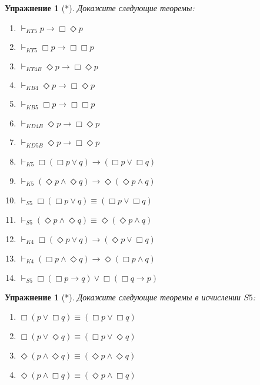\documentclass[11pt]{article}
\newtheorem{exercise}[theorem]{Упражнение}
\begin{document}
\begin{exercise}[*] Докажите следующие теоремы:
\begin{multicols}{2}
\begin{enumerate}
	\item $\vdash_{KT5} p \to \Box \Diamond p$
	\item $\vdash_{KT5} \Box p \to \Box \Box p$
	\item $\vdash_{KT4B} \Diamond p \to \Box \Diamond p$
	\item $\vdash_{KB4} \Diamond p \to \Box \Diamond p $
	\item $\vdash_{KB5} \Box p \to \Box \Box p $
    \item $\vdash_{KD4B} \Diamond p \to \Box \Diamond p$
    \item $\vdash_{KD5B} \Diamond p \to \Box \Diamond p$
    \item $\vdash_{K5} \Box (\Box p \vee q ) \to (\Box p \vee \Box q)$
    \item $\vdash_{K5} (\Diamond p \wedge \Diamond q) \to \Diamond (\Diamond p \wedge q) $
    \item $\vdash_{S5} \Box (\Box p \vee q ) \equiv (\Box p \vee \Box q)$
    \item $\vdash_{S5} (\Diamond p \wedge \Diamond q) \equiv \Diamond (\Diamond p \wedge q) $
    \item $\vdash_{K4} \Box (\Diamond p \vee q ) \to (\Diamond p \vee \Box q)$
    \item $\vdash_{K4} (\Box p \wedge \Diamond q) \to \Diamond (\Box p \wedge q) $
    \item $\vdash_{S5} \Box (\Box p \to q) \vee \Box (\Box q \to p)$
\end{enumerate}
\end{multicols}
\end{exercise}


\begin{exercise}[*] Докажите следующие теоремы в исчислении $S5$:
\begin{multicols}{2}
\begin{enumerate}
\item $\Box (p \vee \Box q) \equiv (\Box p \vee \Box q)$
\item $\Box (p \vee \Diamond q) \equiv (\Box p \vee \Diamond q)$
\item $\Diamond (p \wedge \Diamond q) \equiv (\Diamond p \wedge \Diamond q)$
\item $\Diamond (p \wedge \Box q) \equiv (\Diamond p \wedge \Box q)$
\end{enumerate}
\end{multicols}
\end{exercise}
\end{document}
